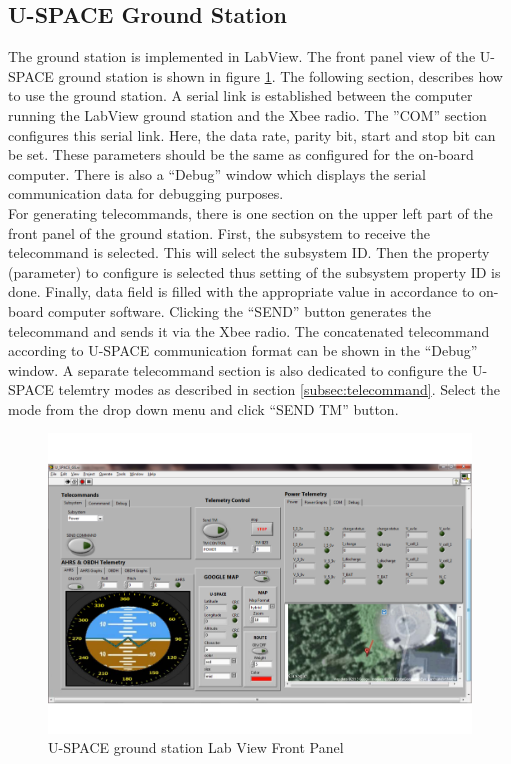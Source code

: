 \subsection{U-SPACE Ground Station}
The ground station is implemented in LabView. The front panel view of the \ac{U-SPACE} ground station is shown in figure \ref{fig:Labview_ground_station}. The following section, describes how to use the ground station. A serial link is established between the computer running the LabView ground station and the Xbee radio. The ''COM'' section configures this serial link. Here, the data rate, parity bit, start and stop bit can be set. These parameters should be the same as configured for the on-board computer. There is also a ``Debug'' window which displays the serial communication data for debugging purposes. \\
%
For generating telecommands, there is one section on the upper left part of the front panel of the ground station. First, the subsystem to receive the telecommand is selected. This will select the subsystem ID. Then the property (parameter) to configure is selected thus setting of the subsystem property ID is done. Finally, data field is filled with the appropriate value in accordance to on-board computer software. Clicking the ``SEND'' button generates the telecommand and sends it via the Xbee radio. The concatenated telecommand according to \ac{U-SPACE} communication format can be shown in the ``Debug'' window. A separate telecommand section is also dedicated to configure the \ac{U-SPACE} telemtry modes as described in section \ref{subsec:telecommand}. Select the mode from the drop down menu and click ``SEND TM'' button.
\\
\begin{figure}[bht]
\centering
\includegraphics[scale=0.5]{figures/GS.pdf}
\caption{U-SPACE ground station Lab View Front Panel}
\label{fig:Labview_ground_station}
\end{figure}
